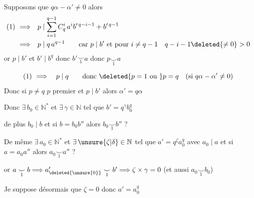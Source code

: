 Supposons que $q\alpha-\alpha'\ne0$ alors
\[
\begin{aligned}
(1)\ \Longrightarrow\quad &p\mid\sum_{i=1}^{q-1}C_q^i\,a^i b'^{\,q-i-1}+b'^{\,q-1}\\
\Longrightarrow\quad &p\mid q\,a^{q-1}\qquad\text{car }p\mid b'\ \text{et pour }i\ne q-1\quad q-i-1\deleted{\ne0}>0
\end{aligned}
\]
or $p\mid b'$ et $b'\mid b^q$ donc $b'\mathrel{\underset{1}{\smile}}a$ donc $p\mathrel{\underset{1}{\smile}}a$

\[
(1)\ \Longrightarrow\quad p\mid q\qquad\text{donc }\deleted{p=1\ \text{ou }}p=q\quad(\text{si }q\alpha-\alpha'\ne0)
\]
Donc si $p\ne q$ \quad $p$ premier  et $p\mid b'$ alors $\alpha'=q\alpha$

Donc $\exists\,b_0\in\mathbb N^*$ et $\exists\,\gamma\in\mathbb N$ tel que $b'=q^\gamma b_0^q$ 

de plus $b_0\mid b$ et si $b=b_0 b''$ alors $b_0\mathrel{\underset{1}{\smile}}b''$ ?

De même $\exists\,a_0\in\mathbb N^*$ et $\exists\,\unsure{\zeta|\delta}\in\mathbb N$ tel que $a'=q^\zeta a_0^q$ avec $a_0\mid a$ et si $a=a_0a''$ alors $a_0\mathrel{\underset{1}{\smile}}a''$ ?

or $a\mathrel{\underset{1}{\smile}}b\Longrightarrow a_{\deleted{\unsure{0}}}'\mathrel{\underset{1}{\smile}}b'\Longrightarrow\zeta\times\gamma=0$ (et aussi $a_0\mathrel{\underset{1}{\smile}}b_0$)

Je suppose désormais que $\zeta=0$ donc $a'=a_0^q$

